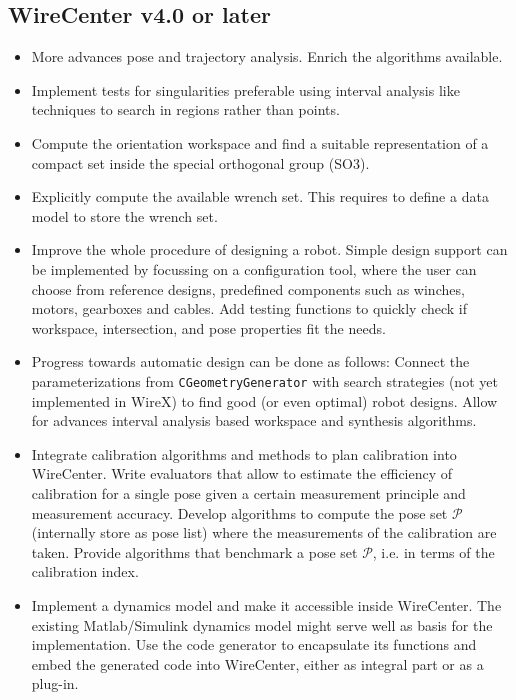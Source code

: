 \documentclass[11pt,a4paper,onepage,openany]{book}
\begin{document}
\subsection{WireCenter v4.0 or later}
\begin{itemize}
\item More advances pose and trajectory analysis. Enrich the algorithms
    available.

\item Implement tests for singularities preferable using interval analysis
    like techniques to search in regions rather than points.

\item Compute the orientation workspace and find a suitable representation
    of a compact set inside the special orthogonal group (SO3).

\item Explicitly compute the available wrench set. This requires to define
    a data model to store the wrench set.

\item Improve the whole procedure of designing a robot. Simple design support
    can be implemented by focussing on a configuration tool, where the user
    can choose from reference designs, predefined components such as winches,
    motors, gearboxes and cables. Add testing functions to quickly check if
    workspace, intersection, and pose properties fit the needs.

\item Progress towards automatic design can be done as follows: Connect the
    parameterizations from \texttt{CGeometryGenerator} with search strategies
    (not yet implemented in WireX) to find good (or even optimal) robot
    designs. Allow for advances interval analysis based workspace and
    synthesis algorithms.

\item Integrate calibration algorithms and methods to plan calibration into
    WireCenter. Write evaluators that allow to estimate the efficiency of
    calibration for a single pose given a certain measurement principle and
    measurement accuracy. Develop algorithms to compute the pose set
    $\mathcal P$ (internally store as pose list) where the measurements of
    the calibration are taken. Provide algorithms that benchmark a pose set
    $\mathcal P$, i.e. in terms of the calibration index.

\item Implement a dynamics model and make it accessible inside WireCenter.
    The existing Matlab/Simulink dynamics model might serve well as basis for
    the implementation. Use the code generator to encapsulate its functions
    and embed the generated code into WireCenter, either as integral part or
    as a plug-in.


\end{itemize}
\end{document}
